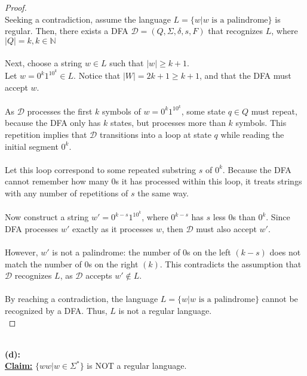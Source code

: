 \documentclass[12pt]{article}
\begin{document}
\begin{proof}
\leavevmode\\
    Seeking a contradiction, assume the language $L = \{ w | w \text{ is a palindrome} \}$ is regular. Then, there exists a DFA $\mathcal{D} = (Q, \Sigma, \delta, s, F)$ that recognizes $L$, where $|Q| = k, k \in \mathbb{N}$ \\
    \\
    Next, choose a string $w \in L$ such that $|w| \geq k + 1$. \\
    Let $w = 0^k1^10^k \in L$. Notice that $|W| = 2k + 1 \geq k + 1$, and that the DFA must accept $w$. \\
    \\
    As $\mathcal{D}$ processes the first $k$ symbols of $w = 0^k1^10^k$, some state $q \in Q$ must repeat, because the DFA only has $k$ states, but processes more than $k$ symbols. This repetition implies that $\mathcal{D}$ transitions into a loop at state $q$ while reading the initial segment $0^k$. \\
    \\
    Let this loop correspond to some repeated substring $s$ of $0^k$. Because the DFA cannot remember how many $0$s it has processed within this loop, it treats strings with any number of repetitions of $s$ the same way. \\
    \\
    Now construct a string $w' = 0^{k - s}1^10^k$, where $0^{k - s}$ has $s$ less $0$s than $0^k$. Since DFA processes $w'$ exactly as it processes $w$, then $\mathcal{D}$ must also accept $w'$. \\
    \\
    However, $w'$ is not a palindrome: the number of $0$s on the left $(k - s)$ does not match the number of $0$s on the right $(k)$. This contradicts the assumption that $\mathcal{D}$ recognizes $L$, as $\mathcal{D}$ accepts $w' \notin L$. \\
    \\
    By reaching a contradiction, the language $L = \{ w | w \text{ is a palindrome} \}$ cannot be recognized by a DFA. Thus, $L$ is not a regular language. \\
\end{proof}
\leavevmode\\
\textbf{(d):} \\
\textbf{\underline{Claim:}} $\{ ww | w \in \Sigma^* \}$ is NOT a regular language.
\end{document}
